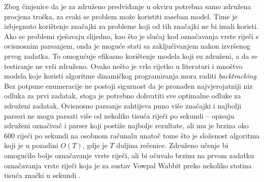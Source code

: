 Zbog činjenice da je za združeno predviđanje u \lts{} okviru potrebna samo
združena procjena troška, za svaki se problem može koristiti zaseban model. Time
je izbjegnuto korištenje značajki za probleme koji od tih značajki ne bi imali
koristi. Ako se problemi rješavaju slijedno, kao što je slučaj kod označavanja
vrste riječi s ovisnosnim parsanjem, onda je moguće stati sa zaključivanjem
nakon izvršenog prvog zadatka. To omogućuje efikasno korištenje modela koji su
združeni, a da se testiranje ne vrši združeno. Ovako nešto je vrlo rijetko u
literaturi i mnoštvo modela koje koristi algoritme dinamičkog programiranja mora
raditi \textit{backtracking}. Bez potpune enumeracije ne postoji sigurnost da je
pronađen najvjerojatniji niz odluka za prvi zadatak, stoga je potrebno dohvatiti
sve optimalne odluke za združeni zadatak. Ovisnosno parsanje zahtijeva puno
više značajki i najbolji parseri ne mogu parsati više od nekoliko tisuća
riječi po sekundi -- \citet{andor2016globally} opisuju združeni označivač i
parser koji postiže najbolje rezultate, ali mu je brzina oko 600 riječi po
sekundi na osobnom računalu unatoč tome što je složenost algoritma koji je u
pozadini $O(T)$, gdje je $T$ duljina rečenice. Združeno učenje bi omogućilo
bolje označavanje vrste riječi, ali bi očuvalo brzinu na prvom zadatku
označavanja vrste riječi koja je za sustav Vowpal Wabbit preko nekoliko stotina
tisuća znački u sekundi \citep{daume14lts}.
